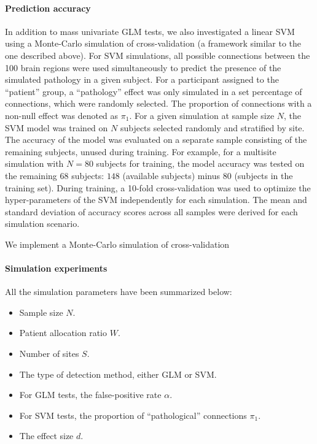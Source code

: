 \documentclass[authoryear]{elsarticle}
\begin{document}

\paragraph{Prediction accuracy}
In addition to mass univariate GLM tests, we also investigated a linear SVM
\citep{Cortes1995} using a Monte-Carlo simulation of cross-validation (a framework similar to the one described above). For SVM simulations, all possible connections between the 100
brain regions were used simultaneously to predict the presence of the simulated
pathology in a given subject. For a participant assigned to the ``patient''
group, a ``pathology'' effect was only simulated in a set percentage of
connections, which were randomly selected. The proportion of connections with a
non-null effect was denoted as $\pi_1$. For a given simulation at sample size
$N$, the SVM model was trained on $N$ subjects selected randomly and stratified
by site. The accuracy of the model was evaluated on a separate sample consisting of the remaining subjects, unused during training. For example, for a multisite simulation with $N=80$ subjects for training, the model accuracy was tested on the remaining $68$ subjects: $148$ (available subjects) minus $80$ (subjects in the training set). During training, a 10-fold cross-validation was used to optimize the hyper-parameters of the SVM independently for each
simulation. The mean and standard deviation of accuracy scores across all
samples were derived for each simulation scenario.

We implement a Monte-Carlo simulation of cross-validation

\paragraph{Simulation experiments}

All the simulation parameters have been summarized below: 
\begin{itemize}
 \item Sample size $N$. 
 \item Patient allocation ratio $W$. 
 \item Number of sites $S$. 
 \item The type of detection method, either GLM or SVM. 
 \item For GLM tests, the false-positive rate $\alpha$. 
 \item For SVM tests, the proportion of ``pathological'' connections $\pi_1$.
 \item The effect size $d$. 
\end{itemize}
\end{document}
